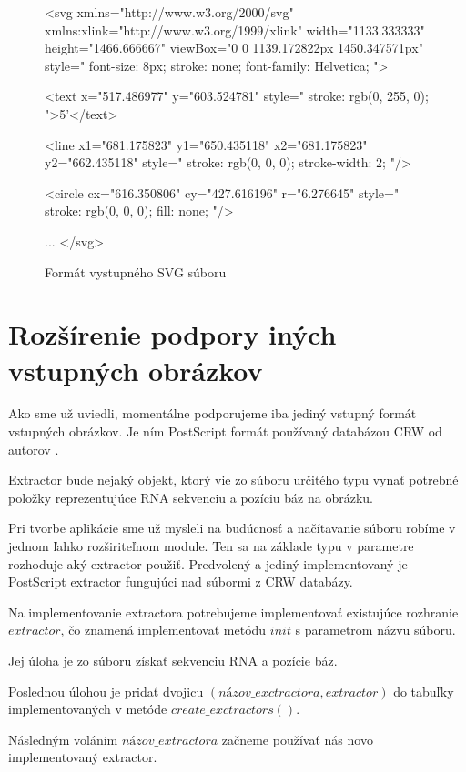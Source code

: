 \begin{figure}
\begin{code}[fontsize=\scriptsize, frame=none, samepage=true]
<svg
  xmlns="http://www.w3.org/2000/svg"
  xmlns:xlink="http://www.w3.org/1999/xlink"
  width="1133.333333"
  height="1466.666667"
  viewBox="0 0 1139.172822px 1450.347571px"
  style="
    font-size: 8px; 
    stroke: none; 
    font-family: Helvetica; ">

  <text 
    x="517.486977"
    y="603.524781"
    style="
      stroke: rgb(0, 255, 0); ">5'</text>

  <line 
    x1="681.175823"
    y1="650.435118" 
    x2="681.175823"
    y2="662.435118"
    style="
      stroke: rgb(0, 0, 0); 
      stroke-width: 2; "/>


  <circle 
    cx="616.350806"
    cy="427.616196"
    r="6.276645"
    style="
      stroke: rgb(0, 0, 0); 
      fill: none; "/>

  ...
</svg>
\end{code}
\caption{Formát vystupného SVG súboru}
\label{obr:svg_out}
\end{figure}


\section{Rozšírenie podpory iných vstupných obrázkov}
\label{kap:rozsirenie}

Ako sme už uviedli, momentálne podporujeme iba jediný vstupný formát vstupných obrázkov.
Je ním PostScript formát používaný databázou CRW od autorov \citet{CRW}.

\begin{definice}
  Extractor bude nejaký objekt, ktorý vie zo súboru určitého typu vynať potrebné
  položky reprezentujúce RNA sekvenciu a pozíciu báz na obrázku.
\end{definice}

Pri tvorbe aplikácie sme už mysleli na budúcnosť a načítavanie súboru robíme v jednom ľahko
rozširiteľnom module. Ten sa na základe typu v parametre  rozhoduje
aký extractor použiť. Predvolený a jediný implementovaný je PostScript extractor fungujúci
nad súbormi z CRW databázy.

Na implementovanie extractora potrebujeme implementovať existujúce rozhranie $extractor$,
čo znamená implementovať metódu $init$ s parametrom názvu súboru.

Jej úloha je zo súboru získať sekvenciu RNA a pozície báz.

Poslednou úlohou je pridať dvojicu $(názov\_exctractora, extractor)$ do tabuľky implementovaných
v metóde $create\_exctractors()$.

Následným volánim   $názov\_extractora$ začneme
používať nás novo implementovaný extractor.



